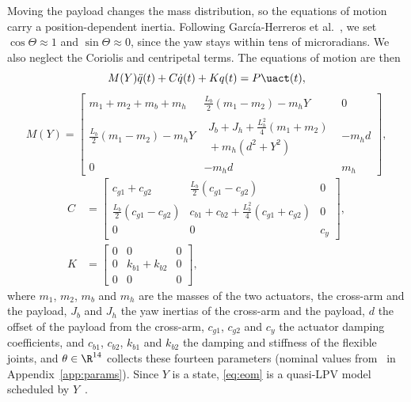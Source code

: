 Moving the payload changes the mass distribution, so the equations of
motion carry a position-dependent inertia.
Following Garc\'ia-Herreros et al.~\cite[Sec.~2.3]{garcia2013model}, we set
$\cos\Theta\approx1$ and $\sin\Theta\approx0$, since the yaw stays within
tens of microradians.
We also neglect the Coriolis and centripetal terms.
The equations of motion are then
\begin{equation}
  M(Y)\ddot{q}(t) + C\dot{q}(t) + K q(t) = P\uact(t),
  \label{eq:eom}
\end{equation}
{\footnotesize
\setlength{\arraycolsep}{2pt}
\begin{equation}
M(Y)=
\begin{bmatrix}
m_1+m_2+m_b+m_h & \tfrac{L_b}{2}(m_1-m_2)-m_hY & 0\\
\tfrac{L_b}{2}(m_1-m_2)-m_hY &
\substack{J_b+J_h+\tfrac{L_b^2}{4}(m_1+m_2)\\{}+m_h(d^2+Y^2)} & -m_hd\\
0 & -m_hd & m_h
\end{bmatrix},
\label{eq:mass_matrix}
\end{equation}
\begin{equation}
\begin{aligned}
C&=
\begin{bmatrix}
c_{g1}+c_{g2} & \tfrac{L_b}{2}(c_{g1}-c_{g2}) & 0\\
\tfrac{L_b}{2}(c_{g1}-c_{g2}) &
c_{b1}+c_{b2}+\tfrac{L_b^2}{4}(c_{g1}+c_{g2}) & 0\\
0 & 0 & c_y
\end{bmatrix},\\[1ex]
K&=
\begin{bmatrix}
0&0&0\\
0&k_{b1}+k_{b2}&0\\
0&0&0
\end{bmatrix},
\end{aligned}
\label{eq:damping_stiffness_matrices}
\end{equation}
}
where $m_1$, $m_2$, $m_b$ and $m_h$ are the masses of the two actuators,
the cross-arm and the payload, $J_b$ and $J_h$ the yaw inertias of the
cross-arm and the payload, $d$ the offset of the payload from the cross-arm,
$c_{g1}$, $c_{g2}$ and $c_y$ the actuator damping coefficients, and
$c_{b1}$, $c_{b2}$, $k_{b1}$ and $k_{b2}$ the damping and stiffness of the
flexible joints, and $\theta\in\R^{14}$ collects these fourteen parameters
(nominal values from~\cite[Table~I]{garcia2013model} in
Appendix~\ref{app:params}).
Since $Y$ is a state, \eqref{eq:eom} is a quasi-LPV model scheduled by
$Y$~\cite[Def.~7.2]{toth2010modeling}.

